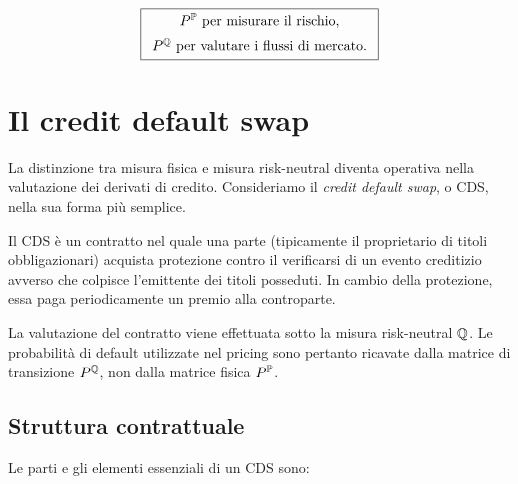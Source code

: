 \[
\boxed{
\begin{array}{c}
P^{\mathbb{P}}
\text{ per misurare il rischio,}
\\[2mm]
P^{\mathbb{Q}}
\text{ per valutare i flussi di mercato.}
\end{array}
}
\]

\section{Il credit default swap}

\label{sec:cap9-cds}

La distinzione tra misura fisica e misura risk-neutral diventa
operativa nella valutazione dei derivati di credito. Consideriamo il
\emph{credit default swap}, o CDS, nella sua forma pi\`{u} semplice.

Il CDS \`{e} un contratto nel quale una parte (tipicamente il proprietario di titoli obbligazionari) acquista protezione
contro il verificarsi di un evento creditizio avverso che colpisce l'emittente dei titoli posseduti. In cambio della protezione, essa paga periodicamente un
premio alla controparte.

La valutazione del contratto viene effettuata sotto la misura
risk-neutral $\mathbb{Q}$. Le probabilit\`{a} di default utilizzate nel pricing
sono pertanto ricavate dalla matrice di transizione $P^{\mathbb{Q}}$, non dalla
matrice fisica $P^{\mathbb{P}}$.

\subsection{Struttura contrattuale}

\label{subsec:cap9-cds-struttura}

Le parti e gli elementi essenziali di un CDS sono:

